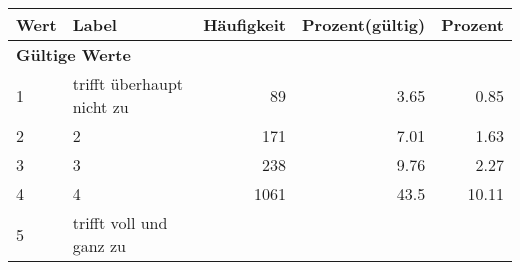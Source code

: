      \begin{longtable}{lXrrr}
     \toprule
     \textbf{Wert} & \textbf{Label} & \textbf{Häufigkeit} & \textbf{Prozent(gültig)} & \textbf{Prozent} \\
     \endhead
     \midrule
     \multicolumn{5}{l}{\textbf{Gültige Werte}}\\

     1 &
     \multicolumn{1}{X}{ trifft überhaupt nicht zu   } &


       \num{89} &
       \num[round-mode=places,round-precision=2]{3.65} &
         \num[round-mode=places,round-precision=2]{0.85} \\

     2 &
     \multicolumn{1}{X}{ 2   } &


       \num{171} &
       \num[round-mode=places,round-precision=2]{7.01} &
         \num[round-mode=places,round-precision=2]{1.63} \\

     3 &
     \multicolumn{1}{X}{ 3   } &


       \num{238} &
       \num[round-mode=places,round-precision=2]{9.76} &
         \num[round-mode=places,round-precision=2]{2.27} \\

     4 &
     \multicolumn{1}{X}{ 4   } &


       \num{1061} &
       \num[round-mode=places,round-precision=2]{43.5} &
         \num[round-mode=places,round-precision=2]{10.11} \\

     5 &
     \multicolumn{1}{X}{ trifft voll und ganz zu   } &



\end{longtable}
